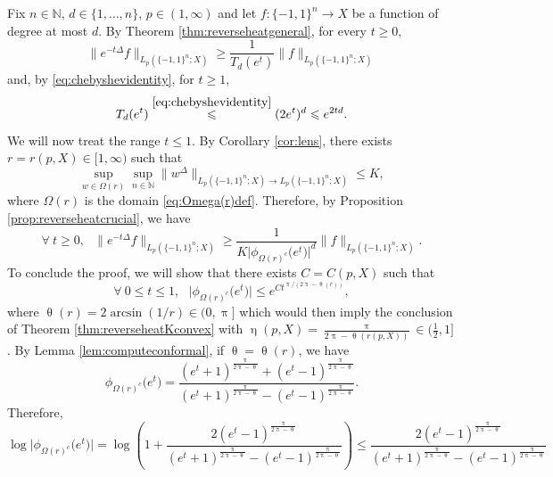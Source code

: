 \documentclass[11pt,reqno]{amsart}
\renewcommand{\leq}{\leqslant}
\renewcommand{\geq}{\geqslant}
\renewcommand{\pi}{\uppi}
\newcommand{\1}{\mathbf 1}
\theoremstyle{remark}
\newcommand{\N}{\mathbb N}
\renewcommand{\theta}{\uptheta}
\renewcommand{\pi}{\uppi}
\renewcommand{\eta}{\upeta}
\renewcommand{\pi}{\uppi}
\begin{document}
 Fix $n\in\N$, $d\in\{1,\ldots,n\}$, $p\in(1,\infty)$ and let $f:\{-1,1\}^n\to X$ be a function of degree at most $d$. By Theorem \ref{thm:reverseheatgeneral}, for every $t\geq0$,
\begin{equation}
\|e^{-t\Delta}f\|_{L_p(\{-1,1\}^n;X)} \geq \frac{1}{T_d(e^t)} \|f\|_{L_p(\{-1,1\}^n;X)}
\end{equation}
and, by \eqref{eq:chebyshevidentity}, for $t\geq1$,
\begin{equation}
T_d(e^t) \stackrel{\eqref{eq:chebyshevidentity}}{\leq} (2e^t)^d \leq e^{2td}.
\end{equation}
We will now treat the range $t\leq1$. By Corollary \ref{cor:lens}, there exists $r=r(p,X)\in[1,\infty)$ such that
\begin{equation}
\sup_{w\in\Omega(r)} \sup_{n\in\N} \|w^\Delta\|_{{L_p(\{-1,1\}^n;X)}\to {L_p(\{-1,1\}^n;X)}} \leq K,
\end{equation}
where $\Omega(r)$ is the domain \eqref{eq:Omega(r)def}. Therefore, by Proposition \ref{prop:reverseheatcrucial}, we have
\begin{equation}
\forall \ t\geq0, \ \ \ \|e^{-t\Delta}f\|_{L_p(\{-1,1\}^n;X)} \geq \frac{1}{K\big|\phi_{\Omega(r)^c}\big(e^{t}\big)\big|^d} \|f\|_{L_p(\{-1,1\}^n;X)}.
\end{equation}
To conclude the proof, we will show that there exists $C=C(p,X)$ such that
\begin{equation} \label{eq:boundconformalbypower2}
\forall \ 0\leq t\leq 1, \ \ \ \big|\phi_{\Omega(r)^c}\big(e^{t}\big)\big| \leq e^{C t^{\pi/(2\pi-\theta(r))}},
\end{equation}
where $\theta(r) = 2\arcsin(1/r)\in(0,\pi]$ which would then imply the conclusion of Theorem \ref{thm:reverseheatKconvex} with $\eta(p,X) = \frac{\pi}{2\pi-\theta(r(p,X))} \in \big(\frac{1}{2},1\big]$. By Lemma \ref{lem:computeconformal}, if $\theta=\theta(r)$, we have
\begin{equation} \label{eq:phiomegacr}
\phi_{\Omega(r)^c}\big(e^t\big) = \frac{(e^t+1)^{\frac{\pi}{2\pi-\theta}}+(e^t-1)^{\frac{\pi}{2\pi-\theta}}}{(e^t+1)^{\frac{\pi}{2\pi-\theta}}-(e^t-1)^{\frac{\pi}{2\pi-\theta}}}.
\end{equation}
Therefore,
\begin{equation}
\log \big|\phi_{\Omega(r)^c}\big(e^t\big)\big| = \log\left(1 + \frac{2(e^t-1)^{\frac{\pi}{2\pi-\theta}}}{(e^t+1)^{\frac{\pi}{2\pi-\theta}}-(e^t-1)^{\frac{\pi}{2\pi-\theta}}} \right) \leq \frac{2(e^t-1)^{\frac{\pi}{2\pi-\theta}}}{(e^t+1)^{\frac{\pi}{2\pi-\theta}}-(e^t-1)^{\frac{\pi}{2\pi-\theta}}}
\end{equation}
\end{document}
